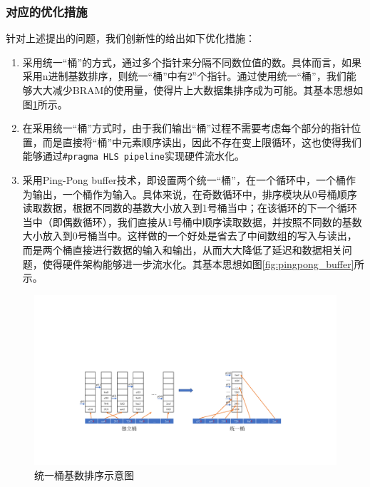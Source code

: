 \subsubsection{对应的优化措施}

针对上述提出的问题，我们创新性的给出如下优化措施：

\begin{enumerate}
    \item 采用统一“桶”的方式，通过多个指针来分隔不同数位值的数。具体而言，如果采用n进制基数排序，则统一“桶”中有$2^n$个指针。通过使用统一“桶”，我们能够大大减少BRAM的使用量，使得片上大数据集排序成为可能。其基本思想如图\ref{fig:unified_bucket}所示。
    \item 在采用统一“桶”方式时，由于我们输出“桶”过程不需要考虑每个部分的指针位置，而是直接将“桶”中元素顺序读出，因此不存在变上限循环，这也使得我们能够通过\verb|#pragma HLS pipeline|实现硬件流水化。
    \item 采用Ping-Pong buffer技术，即设置两个统一“桶”，在一个循环中，一个桶作为输出，一个桶作为输入。具体来说，在奇数循环中，排序模块从0号桶顺序读取数据，根据不同数的基数大小放入到1号桶当中；在该循环的下一个循环当中（即偶数循环），我们直接从1号桶中顺序读取数据，并按照不同数的基数大小放入到0号桶当中。这样做的一个好处是省去了中间数组的写入与读出，而是两个桶直接进行数据的输入和输出，从而大大降低了延迟和数据相关问题，使得硬件架构能够进一步流水化。其基本思想如图\ref{fig:pingpong_buffer}所示。
\end{enumerate}
\begin{figure}[htbp]
    \centering
    \includegraphics[width=\linewidth]{figures/unified_bucket.pdf}
    \caption{统一桶基数排序示意图}
    \label{fig:unified_bucket}
\end{figure}

